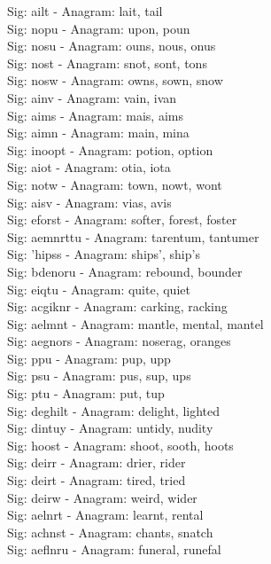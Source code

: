 Sig: {ailt} - Anagram: lait, tail \\
Sig: {nopu} - Anagram: upon, poun \\
Sig: {nosu} - Anagram: ouns, nous, onus \\
Sig: {nost} - Anagram: snot, sont, tons \\
Sig: {nosw} - Anagram: owns, sown, snow \\
Sig: {ainv} - Anagram: vain, ivan \\
Sig: {aims} - Anagram: mais, aims \\
Sig: {aimn} - Anagram: main, mina \\
Sig: {inoopt} - Anagram: potion, option \\
Sig: {aiot} - Anagram: otia, iota \\
Sig: {notw} - Anagram: town, nowt, wont \\
Sig: {aisv} - Anagram: vias, avis \\
Sig: {eforst} - Anagram: softer, forest, foster \\
Sig: {aemnrttu} - Anagram: tarentum, tantumer \\
Sig: {'hipss} - Anagram: ships', ship's \\
Sig: {bdenoru} - Anagram: rebound, bounder \\
Sig: {eiqtu} - Anagram: quite, quiet \\
Sig: {acgiknr} - Anagram: carking, racking \\
Sig: {aelmnt} - Anagram: mantle, mental, mantel \\
Sig: {aegnors} - Anagram: noserag, oranges \\
Sig: {ppu} - Anagram: pup, upp \\
Sig: {psu} - Anagram: pus, sup, ups \\
Sig: {ptu} - Anagram: put, tup \\
Sig: {deghilt} - Anagram: delight, lighted \\
Sig: {dintuy} - Anagram: untidy, nudity \\
Sig: {hoost} - Anagram: shoot, sooth, hoots \\
Sig: {deirr} - Anagram: drier, rider \\
Sig: {deirt} - Anagram: tired, tried \\
Sig: {deirw} - Anagram: weird, wider \\
Sig: {aelnrt} - Anagram: learnt, rental \\
Sig: {achnst} - Anagram: chants, snatch \\
Sig: {aeflnru} - Anagram: funeral, runefal \\
